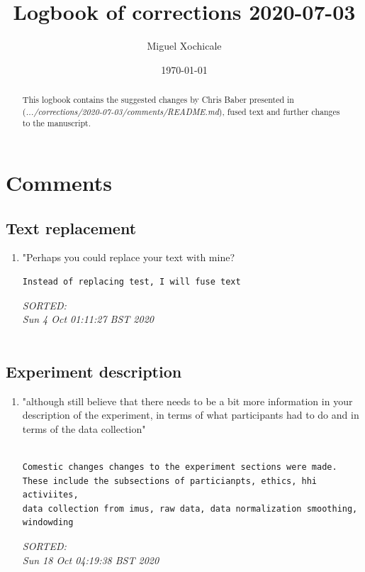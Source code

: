 \documentclass[10pt]{article}
\title{
Logbook of corrections 2020-07-03 
}
\author{Miguel Xochicale}
\date{ \today }
\begin{document}
\maketitle

\begin{abstract}
This logbook contains the suggested changes by Chris Baber 
presented in (\emph{.../corrections/2020-07-03/comments/README.md}),
fused text and further changes to the manuscript.
\end{abstract}


\tableofcontents


\section{Comments}
\subsection{Text replacement}
\begin{enumerate}
\item 
"Perhaps you could replace your text with mine?  
\begin{verbatim}
Instead of replacing test, I will fuse text
\end{verbatim}
\textit{
SORTED: \\ 
Sun  4 Oct 01:11:27 BST 2020\\
}
\\
\end{enumerate}



\subsection{Experiment description}
\begin{enumerate}
\item 
"although still believe that there needs to be a bit more information in your description of the experiment, in terms of what participants had to do and in terms of the data collection"
\begin{verbatim}

Comestic changes changes to the experiment sections were made.
These include the subsections of particianpts, ethics, hhi activiites,
data collection from imus, raw data, data normalization smoothing, windowding

\end{verbatim}
\textit{
SORTED: \\ 
Sun 18 Oct 04:19:38 BST 2020
\\
}
\\
\end{enumerate}
\end{document}
